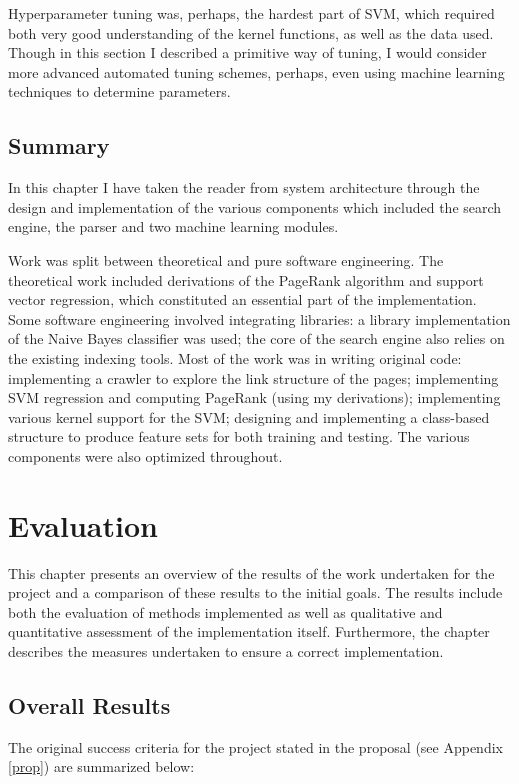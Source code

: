 \documentclass[12pt,a4paper,notitlepage,twoside]{scrbook}
\begin{document}
Hyperparameter tuning was, perhaps, the hardest part of SVM, which required both very good
understanding of the kernel functions, as well as the data used. Though in this section I
described a primitive way of tuning, I would consider more advanced automated tuning
schemes, perhaps, even using machine learning techniques to determine parameters.

\section{Summary}
In this chapter I have taken the reader from system architecture through the design and
implementation of the various components which included the search engine, the parser and
two machine learning modules.

Work was split between theoretical and pure software engineering. The theoretical work
included derivations of the PageRank algorithm and support vector regression, which
constituted an essential part of the implementation. Some software engineering involved
integrating libraries: a library implementation of the Naive Bayes classifier was
used; the core of the search engine also relies on the existing
indexing tools.  Most of the work was in writing original code: implementing a crawler to
explore the link structure of the pages; implementing SVM regression and computing PageRank
(using my derivations); implementing various kernel support for the SVM; designing and
implementing a class-based structure to produce feature sets for both training and
testing. The various components were also optimized throughout.


\chapter{Evaluation}
This chapter presents an overview of the results of the work undertaken for the project
and a comparison of these results to the initial goals. The results include both the
evaluation of methods implemented as well as qualitative and quantitative assessment of
the implementation itself. Furthermore, the chapter describes the measures undertaken to
ensure a correct implementation.

\section{Overall Results}
The original success criteria for the project stated in the proposal (see Appendix
\ref{prop}) are summarized below:
\end{document}
